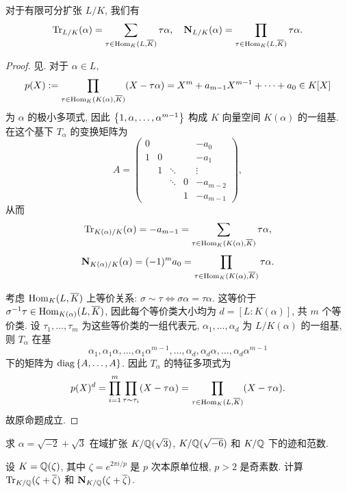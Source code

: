 \begin{proposition}{}{}
对于有限可分扩张 $L/K$, 我们有
  \[{\mathrm{Tr}}_{L/K}(\alpha)=\sum_{\tau\in{\mathrm{Hom}}_K(L,\overline K)}\tau\alpha,\quad 
    {\mathbf{N}}_{L/K}(\alpha)=\prod_{\tau\in{\mathrm{Hom}}_K(L,\overline K)}\tau\alpha.\]
\end{proposition}
\begin{proof}
见\cite[Chapter I, Proposition2.6]{Neukirch1999}.
对于 $\alpha\in L$, 
  \[p(X):=\prod_{\tau\in{\mathrm{Hom}}_K(K(\alpha),\overline K)} (X-\tau\alpha)=X^m+a_{m-1} X^{m-1}+\cdots+a_0\in K[X]\]
为 $\alpha$ 的极小多项式, 因此 $\left\{1,\alpha,\dots,\alpha^{m-1}\right\}$ 构成 $K$ 向量空间 $K(\alpha)$ 的一组基. 在这个基下 $T_\alpha$ 的变换矩阵为
  \[A=\begin{pmatrix}
     0 &   &        &   &-a_0\\
     1 & 0 &        &   &-a_1\\
       & 1 & \ddots &   &\vdots\\
       &   & \ddots & 0 &-a_{m-2}\\
       &   &        & 1 &-a_{m-1}
  \end{pmatrix},\]
从而
  \[{\mathrm{Tr}}_{K(\alpha)/K}(\alpha)=-a_{m-1}=\sum_{\tau\in{\mathrm{Hom}}_K(K(\alpha),\overline K)}\tau\alpha,\]
  \[{\mathbf{N}}_{K(\alpha)/K}(\alpha)=(-1)^m a_0=\prod_{\tau\in{\mathrm{Hom}}_K(K(\alpha),\overline K)}\tau\alpha.\]

考虑 ${\mathrm{Hom}}_K(L,\overline K)$ 上等价关系: $\sigma\sim \tau\iff \sigma \alpha=\tau\alpha$. 这等价于 $\sigma^{-1}\tau\in{\mathrm{Hom}}_{K(\alpha)}(L,\overline K)$, 因此每个等价类大小均为 $d=[L:K(\alpha)]$, 共 $m$ 个等价类. 设 $\tau_1,\dots,\tau_m$ 为这些等价类的一组代表元, $\alpha_1,\dots,\alpha_d$ 为 $L/K(\alpha)$ 的一组基, 则 $T_\alpha$ 在基 
	\[\alpha_1,\alpha_1\alpha,\dots,\alpha_1\alpha^{m-1},\dots,
	\alpha_d,\alpha_d\alpha,\dots,\alpha_d\alpha^{m-1}\]
下的矩阵为 ${\mathrm{diag}}\left\{A,\dots,A\right\}$. 因此 $T_\alpha$ 的特征多项式为
	\[p(X)^d=\prod_{i=1}^m\prod_{\tau\sim\tau_i}(X-\tau \alpha)=\prod_{\tau\in{\mathrm{Hom}}_K(L,\overline K)}(X-\tau\alpha).\]
故原命题成立.
\end{proof}

\begin{exercise}
求 $\alpha=\sqrt{-2}+\sqrt3$ 在域扩张 $K/{\mathbb{Q}}(\sqrt3)$,  $K/{\mathbb{Q}}(\sqrt{-6})$ 和 $K/{\mathbb{Q}}$ 下的迹和范数.
\end{exercise}

\begin{exercise}
设 $K={\mathbb{Q}}(\zeta)$, 其中 $\zeta=e^{2\pi i/p}$ 是 $p$ 次本原单位根, $p>2$ 是奇素数. 计算 ${\mathrm{Tr}}_{K/{\mathbb{Q}}}(\zeta+\overline\zeta)$ 和 ${\mathbf{N}}_{K/{\mathbb{Q}}}(\zeta+\overline\zeta)$.
\end{exercise}

